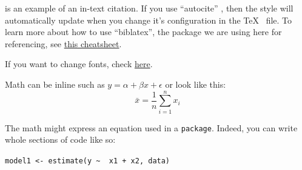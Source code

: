 \documentclass{iheid}
\begin{document}
\textcite{Hollway:2017ke} is an example of an in-text citation. If you use ``autocite'' \autocite{Hollway:2017ke}, then the style will automatically update when you change it's configuration in the \TeX~ file. To learn more about how to use ``biblatex'', the package we are using here for referencing, see \href{http://tug.ctan.org/info/biblatex-cheatsheet/biblatex-cheatsheet.pdf}{this cheatsheet}.

If you want to change fonts, check \href{https://www.tug.org/pracjourn/2006-1/schmidt/schmidt.pdf}{here}.

Math can be inline such as $ y = \alpha + \beta x + \epsilon $ or look like this: $$ \bar{x} = \frac{1}{n} \sum_{i=1}^{n}x_i $$

The math might express an equation used in a \texttt{package}. Indeed, you can write whole sections of code like so:

\texttt{model1 <- estimate(y \textasciitilde~ x1 + x2, data)}
	
\newpage
\printbibliography
\end{document}
